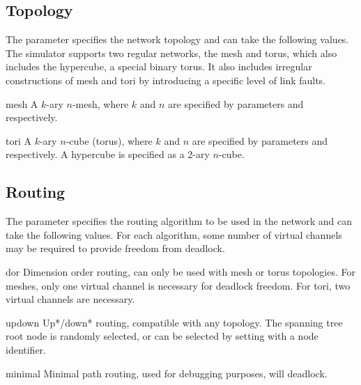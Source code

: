 \documentclass[10pt,a4paper]{article}
\begin{document}
\subsection{Topology}

The  parameter specifies the network topology and can take the
following values. The simulator supports two regular networks, the mesh and
torus, which also includes the hypercube, a special binary torus. It also
includes irregular constructions of mesh and tori by introducing a specific
level of link faults.

\begin{paramlist}

\item[mesh] A $k$-ary $n$-mesh, where $k$ and $n$ are specified by parameters
 and  respectively. 

\item[tori] A $k$-ary $n$-cube (torus), where $k$ and $n$ are specified by
parameters  and  respectively. A hypercube is specified as a 2-ary
$n$-cube.

\end{paramlist}


\subsection{Routing}

The  parameter specifies the routing algorithm to be used in the
network and can take the following values. For each algorithm, some number of
virtual channels may be required to provide freedom from deadlock.

\begin{paramlist}

\item[dor] Dimension order routing, can only be used with mesh or torus
topologies. For meshes, only one virtual channel is necessary for deadlock
freedom. For tori, two virtual channels are necessary.

\item[updown] Up*/down* routing, compatible with any topology. The spanning tree
root node is randomly selected, or can be selected by setting 
with a node identifier.

\item[minimal] Minimal path routing, used for debugging purposes, will deadlock.

\end{paramlist}
\end{document}

